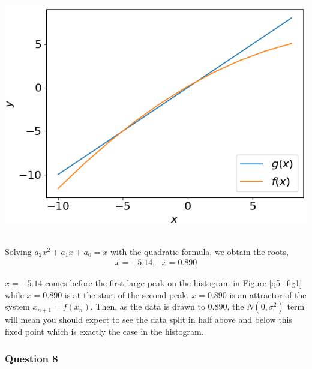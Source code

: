 \documentclass[12pt, a4paper]{article}
\begin{document}
\begin{minipage}{\textwidth}
	\centering
	\includegraphics[width = \linewidth]{q7_fig1}
	\label{q7_fig1}
\end{minipage}
\vspace{0.2cm}\\
Solving $\bar{a}_{2}x^{2}+\bar{a}_{1}x+a_{0} = x$ with the quadratic formula, we obtain the roots,
\begin{align*}
	x = -5.14, ~~~ x = 0.890
\end{align*} 

$x=-5.14$ comes before the first large peak on the histogram in Figure \ref{q5_fig1} while $x=0.890$ is at the start of the second peak. $x=0.890$ is an attractor of the system $x_{n+1}=f(x_{n})$. %
Then, as the data is drawn to $0.890$, the $N(0,\sigma^{2})$ term will mean you should expect to see the data split in half above and below this fixed point which is exactly the case in the histogram.

\subsubsection*{Question 8}
\end{document}
